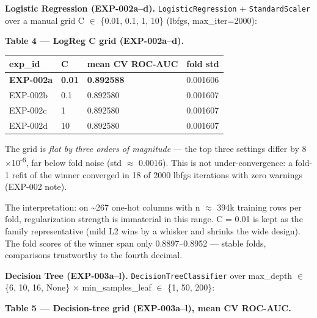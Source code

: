 \documentclass[11pt,a4paper]{article}
\begin{document}
\textbf{Logistic Regression (EXP-002a--d).} \texttt{LogisticRegression}
+ \texttt{StandardScaler} over a manual grid C $\in$ \{0.01, 0.1, 1, 10\}
(lbfgs, max\_iter=2000):

\textbf{Table 4 --- LogReg C grid (EXP-002a--d).}

{\def\LTcaptype{none} %

\begin{center}\small
\begin{tabular}{@{}llll@{}}
\toprule\noalign{}
exp\_id & C & mean CV ROC-AUC & fold std \\
\midrule\noalign{}
\textbf{EXP-002a} & \textbf{0.01} & \textbf{0.892588} & 0.001606 \\
EXP-002b & 0.1 & 0.892580 & 0.001607 \\
EXP-002c & 1 & 0.892580 & 0.001607 \\
EXP-002d & 10 & 0.892580 & 0.001607 \\
\bottomrule
\end{tabular}
\end{center}

}

The grid is \emph{flat by three orders of magnitude} --- the top three
settings differ by 8$\times$10\textsuperscript{-}\textsuperscript{6}, far below fold noise (std $\approx$ 0.0016). This is
not under-convergence: a fold-1 refit of the winner converged in 18 of
2000 lbfgs iterations with zero warnings (EXP-002 note).

The interpretation: on \textasciitilde267 one-hot columns with n $\approx$ 394k
training rows per fold, regularization strength is immaterial in this
range. C = 0.01 is kept as the family representative (mild L2 wins by a
whisker and shrinks the wide design). The fold scores of the winner span
only 0.8897--0.8952 --- stable folds, comparisons trustworthy to the
fourth decimal.

\textbf{Decision Tree (EXP-003a--l).} \texttt{DecisionTreeClassifier}
over max\_depth $\in$ \{6, 10, 16, None\} $\times$ min\_samples\_leaf $\in$ \{1, 50,
200\}:

\textbf{Table 5 --- Decision-tree grid (EXP-003a--l), mean CV ROC-AUC.}
\end{document}
